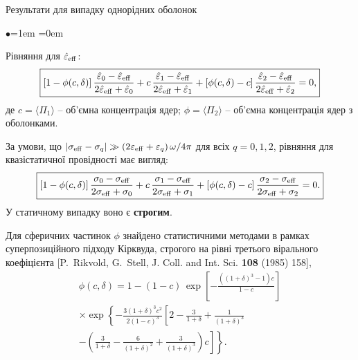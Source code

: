 \documentclass[10pt]{beamer}
\begin{document}
\begin{frame}{Результати для випадку однорідних оболонок}
\footnotesize

\begin{list}{$\bullet$}{\leftmargin=1em \itemindent=0em}
\item
Рівняння для $\hat{\varepsilon}_{\rm eff}$:
\begin{equation}\label{eq:uniformshell}
\boxed{
\left[1-\phi(c, \delta)\right]\frac{\hat{\varepsilon}_0
-\hat{\varepsilon}_{\rm eff}}{2\hat{\varepsilon}_{\rm
eff}+\hat{\varepsilon}_0} + c\,\frac{\hat{\varepsilon}_1
-\hat{\varepsilon}_{\rm eff}}{2\hat{\varepsilon}_{\rm
eff}+\hat{\varepsilon}_1}
+\left[\phi(c, \delta)-c\right]\frac{\hat{\varepsilon}_2
-\hat{\varepsilon}_{\rm eff}}{2\hat{\varepsilon}_{\rm
eff}+\hat{\varepsilon}_2}=0, 
}
\end{equation}
де $c = \langle \Pi_1 \rangle$ -- об'ємна концентрація ядер; $\phi = \langle \Pi_2 \rangle$ -- об'ємна концентрація ядер з оболонками. 

\item
За умови, що  $|\sigma_{\rm eff}-\sigma_{ q}|  \gg  
\left(2\varepsilon_{\rm eff} +\varepsilon_q \right) \omega/4\pi$ для всіх $q=0,1,2$,  рівняння для квазістатичної провідності має вигляд:
\begin{equation}\label{eq:conductivity}
\boxed{
\left[1-\phi(c, \delta)\right]\frac{\sigma_0 -\sigma_{\rm
eff}}{2\sigma_{\rm eff}+\sigma_0} + c\,\frac{\sigma_1 -\sigma_{\rm
eff}}{2\sigma_{\rm eff}+\sigma_1} 
+\left[\phi(c, \delta)-c\right]\frac{\sigma_2 -\sigma_{\rm
eff}}{2\sigma_{\rm eff}+\sigma_2}=0. 
}
\end{equation}
У статичному випадку воно є \textbf{строгим}.

\item
Для сферичних частинок $\phi$ знайдено статистичними методами в рамках суперпозиційного підходу Кірквуда, строгого на рівні третього вірального коефіцієнта  [P.~Rikvold, G.~Stell, J. Coll. and Int. Sci. {\bf 108} (1985) 158],
\begin{equation}\label{effectiveconcentration}
\begin{split}
\phi(c,\delta)= 1-
(1 - c)\,\exp\left[{-\frac{((1+\delta)^3 -
1)c}{1-c}}\right] \\
 \times  \exp\left\{
- \frac{3(1 + \delta)^3
c^2}{2(1 - c)^3} \left[2 - \frac{3}{1+\delta} +
\frac{1}{(1+\delta)^3} \right. \right. \\
- \left. \left. \left( \frac{3}{1+\delta} -
\frac{6}{(1+\delta)^2} + \frac{3}{(1+\delta)^3}\right) c
\right]\right\}. 
\end{split}
\end{equation}

\end{list}

\end{frame}
\end{document}

